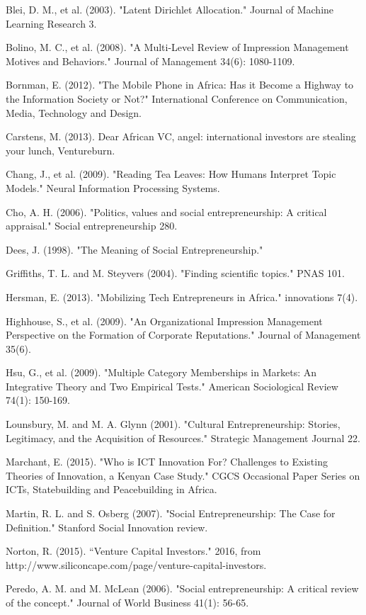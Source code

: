 \documentclass[12pt]{article}
\begin{document}
Blei, D. M., et al. (2003). "Latent Dirichlet Allocation." Journal of Machine Learning Research 3.
	
Bolino, M. C., et al. (2008). "A Multi-Level Review of Impression Management Motives and Behaviors." Journal of Management 34(6): 1080-1109.
	
Bornman, E. (2012). "The Mobile Phone in Africa: Has it Become a Highway to the Information Society or Not?" International Conference on Communication, Media, Technology and Design.
	
Carstens, M. (2013). Dear African VC, angel: international investors are stealing your lunch, Ventureburn.
	
Chang, J., et al. (2009). "Reading Tea Leaves: How Humans Interpret Topic Models." Neural Information Processing Systems.
	
Cho, A. H. (2006). "Politics, values and social entrepreneurship: A critical appraisal." Social entrepreneurship 280.
	
Dees, J. (1998). "The Meaning of Social Entrepreneurship."
	
Griffiths, T. L. and M. Steyvers (2004). "Finding scientific topics." PNAS 101.
	
Hersman, E. (2013). "Mobilizing Tech Entrepreneurs in Africa." innovations 7(4).
	
Highhouse, S., et al. (2009). "An Organizational Impression Management Perspective on the Formation of Corporate Reputations." Journal of Management 35(6).
	
Hsu, G., et al. (2009). "Multiple Category Memberships in Markets: An Integrative Theory and Two Empirical Tests." American Sociological Review 74(1): 150-169.
	
Lounsbury, M. and M. A. Glynn (2001). "Cultural Entrepreneurship: Stories, Legitimacy, and the Acquisition of Resources." Strategic Management Journal 22.
	
Marchant, E. (2015). "Who is ICT Innovation For? Challenges to Existing Theories of Innovation, a Kenyan Case Study." CGCS Occasional Paper Series on ICTs, Statebuilding and Peacebuilding in Africa.
	
Martin, R. L. and S. Osberg (2007). "Social Entrepreneurship: The Case for Definition." Stanford Social Innovation review.
	
Norton, R. (2015). ``Venture Capital Investors." 2016, from http://www.siliconcape.com/page/venture-capital-investors.
	
Peredo, A. M. and M. McLean (2006). "Social entrepreneurship: A critical review of the concept." Journal of World Business 41(1): 56-65.
	
\end{document}
